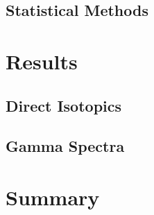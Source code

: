 \documentclass[10pt]{beamer}
\begin{document}
\subsection{Statistical Methods}


\section{Results}
\subsection{Direct Isotopics}

\subsection{Gamma Spectra}


\section{Summary}

\end{document}

